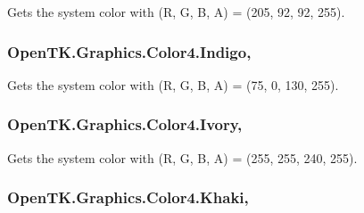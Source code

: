 Gets the system color with (R, G, B, A) = (205, 92, 92, 255). 

\hypertarget{struct_open_t_k_1_1_graphics_1_1_color4_adcc36ceca745a7c2fe795e3e8e894ca6}{
\subsubsection[{Indigo}]{ Open\-T\-K.\-Graphics.\-Color4.\-Indigo\hspace{0.3cm}{\ttfamily [static]}, {\ttfamily [get]}}}\label{struct_open_t_k_1_1_graphics_1_1_color4_adcc36ceca745a7c2fe795e3e8e894ca6}


Gets the system color with (R, G, B, A) = (75, 0, 130, 255). 

\hypertarget{struct_open_t_k_1_1_graphics_1_1_color4_acca0dbc308fc42fc08d40b0593f0df2c}{
\subsubsection[{Ivory}]{ Open\-T\-K.\-Graphics.\-Color4.\-Ivory\hspace{0.3cm}{\ttfamily [static]}, {\ttfamily [get]}}}\label{struct_open_t_k_1_1_graphics_1_1_color4_acca0dbc308fc42fc08d40b0593f0df2c}


Gets the system color with (R, G, B, A) = (255, 255, 240, 255). 

\hypertarget{struct_open_t_k_1_1_graphics_1_1_color4_a22317d6aa03234992d80a41cf9bc99d3}{
\subsubsection[{Khaki}]{ Open\-T\-K.\-Graphics.\-Color4.\-Khaki\hspace{0.3cm}{\ttfamily [static]}, {\ttfamily [get]}}}\label{struct_open_t_k_1_1_graphics_1_1_color4_a22317d6aa03234992d80a41cf9bc99d3}


